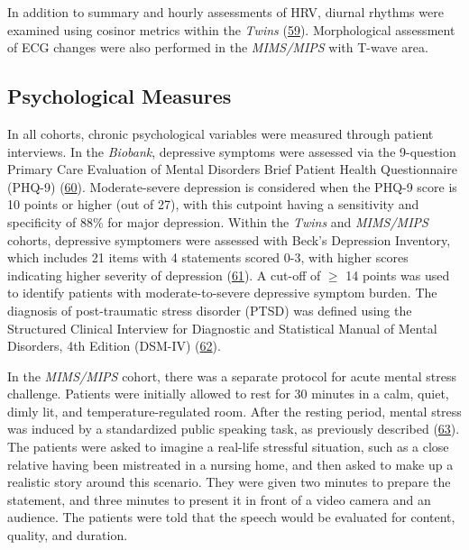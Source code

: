 \documentclass[
  11pt,
  openany]{book}
\begin{document}
In addition to summary and hourly assessments of HRV, diurnal rhythms were examined using cosinor metrics within the \emph{Twins} (\protect\hyperlink{ref-Refinetti2007}{59}). Morphological assessment of ECG changes were also performed in the \emph{MIMS/MIPS} with T-wave area.

\hypertarget{psychological-measures}{%
\subsection{Psychological Measures}\label{psychological-measures}}

In all cohorts, chronic psychological variables were measured through patient interviews.
In the \emph{Biobank}, depressive symptoms were assessed via the 9-question Primary Care Evaluation of Mental Disorders Brief Patient Health Questionnaire (PHQ-9) (\protect\hyperlink{ref-Kroenke2001}{60}).
Moderate-severe depression is considered when the PHQ-9 score is 10 points or higher (out of 27), with this cutpoint having a sensitivity and specificity of 88\% for major depression.
Within the \emph{Twins} and \emph{MIMS/MIPS} cohorts, depressive symptomers were assessed with Beck's Depression Inventory, which includes 21 items with 4 statements scored 0-3, with higher scores indicating higher severity of depression (\protect\hyperlink{ref-Beck1988}{61}).
A cut-off of \(\geq\) 14 points was used to identify patients with moderate-to-severe depressive symptom burden.
The diagnosis of post-traumatic stress disorder (PTSD) was defined using the Structured Clinical Interview for Diagnostic and Statistical Manual of Mental Disorders, 4th Edition (DSM-IV) (\protect\hyperlink{ref-First2004}{62}).

In the \emph{MIMS/MIPS} cohort, there was a separate protocol for acute mental stress challenge.
Patients were initially allowed to rest for 30 minutes in a calm, quiet, dimly lit, and temperature-regulated room.
After the resting period, mental stress was induced by a standardized public speaking task, as previously described (\protect\hyperlink{ref-DavidGoldberg1996}{63}).
The patients were asked to imagine a real-life stressful situation, such as a close relative having been mistreated in a nursing home, and then asked to make up a realistic story around this scenario.
They were given two minutes to prepare the statement, and three minutes to present it in front of a video camera and an audience.
The patients were told that the speech would be evaluated for content, quality, and duration.
\end{document}
